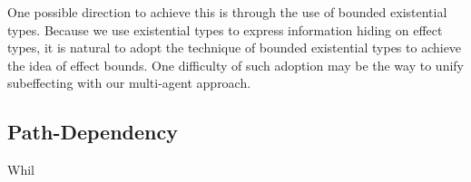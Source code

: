 One possible direction to achieve this is through the use of bounded existential types. Because we use existential types to express information hiding on effect types, it is natural to adopt the technique of bounded existential types to achieve the idea of effect bounds. One difficulty of such adoption may be the way to unify subeffecting with our multi-agent approach.
\subsection{Path-Dependency}
Whil












\begin{comment}
\section{Wyvern with Algebraic Effects hand Handlers}
\todo[inline]{Finish this section}

\subsection{Syntax}
\begin{figure}[htb]
\footnotesize{
\[
\begin{array}{lll}
\begin{array}{lllr}
e & ::= & x \\
& | & l\\
& | & \keyw{new}(x \Rightarrow \overline{d}) \\
& | & [e]_j^\tau\\
& | & e \rhd \tau\\

c & ::= & \m{return} e\\
& | & e.m(e)\\
& | & op(e; y.c)\\
& | & \m{with} h \m{handle} c\\
& | & [c]^\sigma\\
& | &[op]^\varepsilon(e; y.c)



\end{comment}
